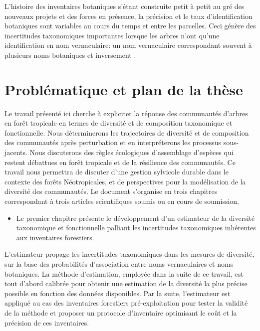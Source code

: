 \documentclass[
  11pt,
  french,
  A4paper,
  extrafontsizes,onecolumn,openright
  ]{memoir}
\providecommand{\tightlist}{%
  \setlength{\itemsep}{0pt}\setlength{\parskip}{0pt}}
\begin{document}
L'histoire des inventaires botaniques s'étant construite petit à petit
au gré des nouveaux projets et des forces en présence, la précision et
le taux d'identification botaniques sont variables au cours du temps et
entre les parcelles. Ceci génère des incertitudes taxonomiques
importantes lorsque les arbres n'ont qu'une identification en nom
vernaculaire: un nom vernaculaire correspondant souvent à plusieurs noms
botaniques et inversement \autocite{Oldeman1968}.

\section{Problématique et plan de la
thèse}\label{problematique-et-plan-de-la-these}

Le travail présenté ici cherche à expliciter la réponse des communautés
d'arbres en forêt tropicale en termes de diversité et de composition
taxonomique et fonctionnelle. Nous déterminerons les trajectoires de
diversité et de composition des communautés après perturbation et en
interpréterons les processus sous-jacents. Nous discuterons des règles
écologiques d'assemblage d'espèces qui restent débattues en forêt
tropicale et de la résilience des communautés. Ce travail nous permettra
de discuter d'une gestion sylvicole durable dans le contexte des forêts
Néotropicales, et de perspectives pour la modélisation de la diversité
des communautés. Le document s'organise en trois chapitres correspondant
à trois articles scientifiques soumis ou en cours de soumission.

\begin{itemize}
\tightlist
\item
  Le premier chapitre présente le développement d'un estimateur de la
  diversité taxonomique et fonctionnelle palliant les incertitudes
  taxonomiques inhérentes aux inventaires forestiers.
\end{itemize}

L'estimateur propage les incertitudes taxonomiques dans les mesures de
diversité, sur la base des probabilités d'association entre noms
vernaculaires et noms botaniques. La méthode d'estimation, employée dans
la suite de ce travail, est tout d'abord calibrée pour obtenir une
estimation de la diversité la plus précise possible en fonction des
données disponibles. Par la suite, l'estimateur est appliqué au cas des
inventaires forestiers pré-exploitation pour tester la validité de la
méthode et proposer un protocole d'inventaire optimisant le coût et la
précision de ces inventaires.
\end{document}
